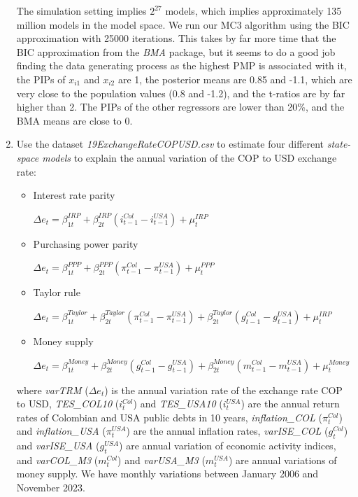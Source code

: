 \begin{enumerate}[leftmargin=*]
The simulation setting implies $2^{27}$ models, which implies approximately 135 million models in the model space. We run our MC3 algorithm using the BIC approximation with 25000 iterations. This takes by far more time that the BIC approximation from the \textit{BMA} package, but it seems to do a good job finding the data generating process as the highest PMP is associated with it, the PIPs of $x_{i1}$ and $x_{i2}$ are 1, the posterior means are 0.85 and -1.1, which are very close to the population values (0.8 and -1.2), and the t-ratios are by far higher than 2. The PIPs of the other regressors are lower than 20\%, and the BMA means are close to 0.


\item Use the dataset \textit{19ExchangeRateCOPUSD.csv} to estimate four different \textit{state-space models} to explain the annual variation of the COP to USD exchange rate: 
\begin{itemize}
	\item Interest rate parity
	
	$\Delta e_t = \beta_{1t}^{IRP} + \beta_{2t}^{IRP} (i_{t-1}^{Col}-i_{t-1}^{USA})+\mu_{t}^{IRP}$ 
	\item Purchasing power parity
	
	$\Delta e_t = \beta_{1t}^{PPP} + \beta_{2t}^{PPP} (\pi_{t-1}^{Col}-\pi_{t-1}^{USA})+\mu_{t}^{PPP}$
	\item Taylor rule
	
	$\Delta e_t = \beta_{1t}^{Taylor} + \beta_{2t}^{Taylor} (\pi_{t-1}^{Col}-\pi_{t-1}^{USA})+\beta_{2t}^{Taylor} (g_{t-1}^{Col}-g_{t-1}^{USA})+\mu_{t}^{IRP}$
	\item Money supply
	
	$\Delta e_t = \beta_{1t}^{Money} + \beta_{2t}^{Money} (g_{t-1}^{Col}-g_{t-1}^{USA})+\beta_{2t}^{Money} (m_{t-1}^{Col}-m_{t-1}^{USA})+\mu_{t}^{Money}$   
\end{itemize}
where \textit{varTRM} ($\Delta e_t$) is the annual variation rate of the exchange rate COP to USD, \textit{TES\_COL10} ($i_{t}^{Col}$) and \textit{TES\_USA10} ($i_{t}^{USA}$) are the annual return rates of Colombian and USA public debts in 10 years, \textit{inflation\_COL} ($\pi_{t}^{Col}$) and \textit{inflation\_USA} ($\pi_{t}^{USA}$) are the annual inflation rates, \textit{varISE\_COL} ($g_{t}^{Col}$) and \textit{varISE\_USA} ($g_{t}^{USA}$) are annual variation of economic activity indices, and \textit{varCOL\_M3} ($m_{t}^{Col}$) and \textit{varUSA\_M3} ($m_{t}^{USA}$) are annual variations of money supply. We have monthly variations between January 2006 and November 2023.


\end{enumerate}
